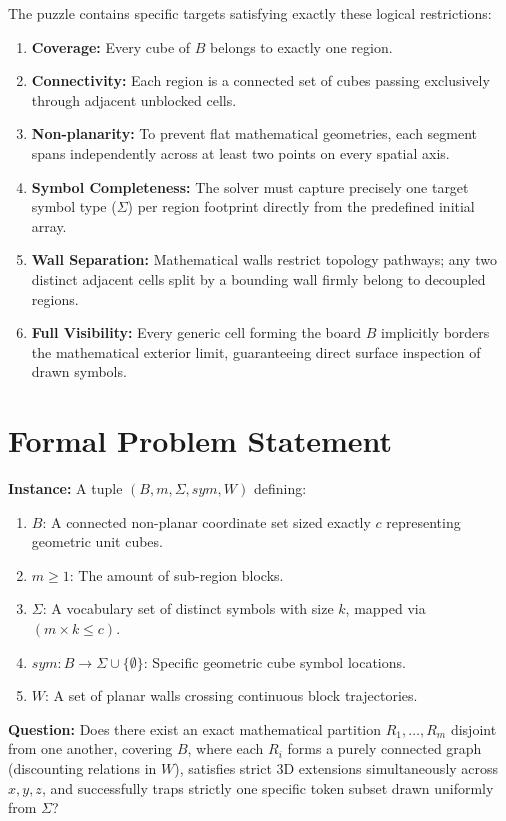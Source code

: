 \documentclass[a4paper,UKenglish,cleveref, autoref, thm-restate]{lipics-v2021}
\begin{document}
The puzzle contains specific targets satisfying exactly these logical restrictions:

\begin{enumerate}
    \item \textbf{Coverage:} Every cube of $B$ belongs to exactly one region. 
    \item \textbf{Connectivity:} Each region is a connected set of cubes passing exclusively through adjacent unblocked cells.
    \item \textbf{Non-planarity:} To prevent flat mathematical geometries, each segment spans independently across at least two points on every spatial axis.
    \item \textbf{Symbol Completeness:} The solver must capture precisely one target symbol type ($\Sigma$) per region footprint directly from the predefined initial array.
    \item \textbf{Wall Separation:} Mathematical walls restrict topology pathways; any two distinct adjacent cells split by a bounding wall firmly belong to decoupled regions.
    \item \textbf{Full Visibility:} Every generic cell forming the board $B$ implicitly borders the mathematical exterior limit, guaranteeing direct surface inspection of drawn symbols.
\end{enumerate}

\section{Formal Problem Statement}
\label{sec:problem_statement}

\textbf{Instance:} A tuple $(B, m, \Sigma, \mathit{sym}, W)$ defining:
\begin{enumerate}
    \item $B$: A connected non-planar coordinate set sized exactly $c$ representing geometric unit cubes.
    \item $m \geq 1$: The amount of sub-region blocks.
    \item $\Sigma$: A vocabulary set of distinct symbols with size $k$, mapped via $(m \times k \leq c)$.
    \item $\mathit{sym}: B \rightarrow \Sigma \cup \{ \emptyset \} $: Specific geometric cube symbol locations.
    \item $W$: A set of planar walls crossing continuous block trajectories.
\end{enumerate}
\textbf{Question:} Does there exist an exact mathematical partition $R_1, \dots, R_m$ disjoint from one another, covering $B$, where each $R_i$ forms a purely connected graph (discounting relations in $W$), satisfies strict 3D extensions simultaneously across $x, y, z$, and successfully traps strictly one specific token subset drawn uniformly from $\Sigma$?
\end{document}
